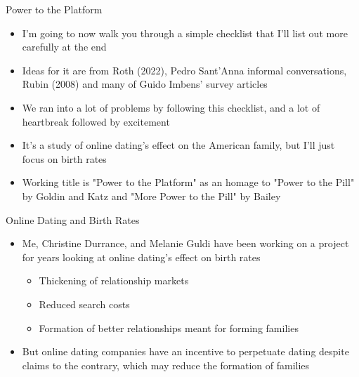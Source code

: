 \documentclass{beamer}
\begin{document}
\begin{frame}{Power to the Platform}

\begin{itemize}
\item I'm going to now walk you through a simple checklist that I'll list out more carefully at the end
\item Ideas for it are from Roth (2022), Pedro Sant'Anna informal conversations, Rubin (2008) and many of Guido Imbens' survey articles
\item We ran into a lot of problems by following this checklist, and a lot of heartbreak followed by excitement
\item It's a study of online dating's effect on the American family, but I'll just focus on birth rates
\item Working title is "Power to the Platform"  as an homage to "Power to the Pill" by Goldin and Katz and "More Power to the Pill" by Bailey
\end{itemize}

\end{frame}





\begin{frame}{Online Dating and Birth Rates}

\begin{itemize}
\item Me, Christine Durrance, and Melanie Guldi have been working on a project for years looking at online dating's effect on birth rates
	\begin{itemize}
	\item Thickening of relationship markets
	\item Reduced search costs
	\item Formation of better relationships meant for forming families
	\end{itemize}
\item But online dating companies have an incentive to perpetuate dating despite claims to the contrary, which may reduce the formation of families
\end{itemize}
\end{frame}
\end{document}
